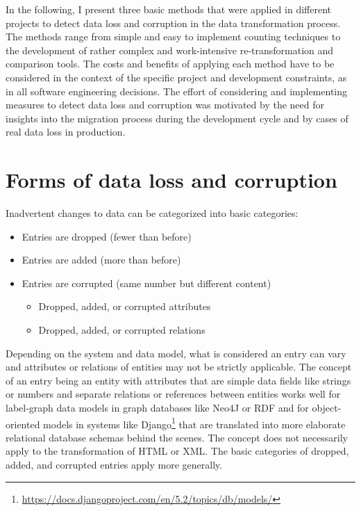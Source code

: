 \documentclass[final]{anthology-ch} %
\begin{document}
In the following, I present three basic methods that were applied in different projects to detect data loss and corruption in the data transformation process. The methods range from simple and easy to implement counting techniques to the development of rather complex and work-intensive re-transformation and comparison tools. The costs and benefits of applying each method have to be considered in the context of the specific project and development constraints, as in all software engineering decisions. The effort of considering and implementing measures to detect data loss and corruption was motivated by the need for insights into the migration process during the development cycle and by cases of real data loss in production.

\section{Forms of data loss and corruption}

Inadvertent changes to data can be categorized into basic categories:

\begin{itemize}
\item Entries are dropped (fewer than before)
\item Entries are added (more than before)
\item Entries are corrupted (same number but different content)
  \begin{itemize}
  \item Dropped, added, or corrupted attributes
  \item Dropped, added, or corrupted relations
  \end{itemize}
\end{itemize}

Depending on the system and data model, what is considered an entry can vary and attributes or relations of entities may not be strictly applicable. The concept of an entry being an entity with attributes that are simple data fields like strings or numbers and separate relations or references between entities works well for label-graph data models in graph databases like Neo4J or RDF and for object-oriented models in systems like Django\footnote{\url{https://docs.djangoproject.com/en/5.2/topics/db/models/}} that are translated into more elaborate relational database schemas behind the scenes. The concept does not necessarily apply to the transformation of HTML or XML. The basic categories of dropped, added, and corrupted entries apply more generally.
\end{document}
